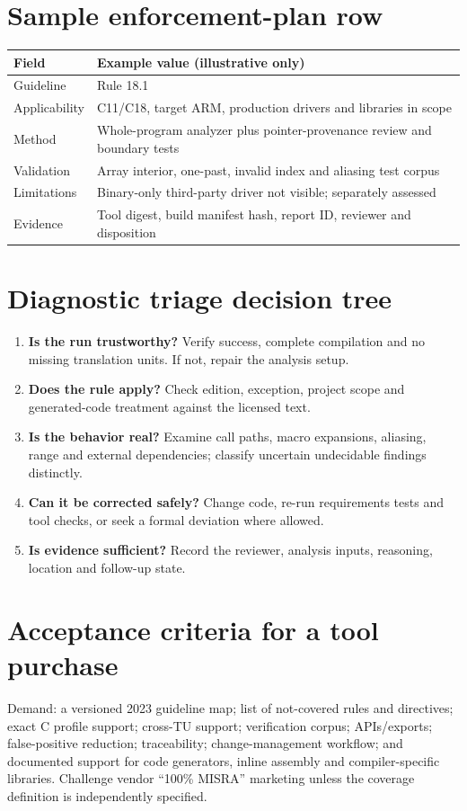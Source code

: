 \documentclass[10pt,letterpaper]{article}
\begin{document}
\section{Sample enforcement-plan row}
\begin{tabularx}{\linewidth}{@{}p{.17\linewidth}X@{}}\toprule
Field & Example value (illustrative only)\\\midrule
Guideline & Rule 18.1\\
Applicability & C11/C18, target ARM, production drivers and libraries in scope\\
Method & Whole-program analyzer plus pointer-provenance review and boundary tests\\
Validation & Array interior, one-past, invalid index and aliasing test corpus\\
Limitations & Binary-only third-party driver not visible; separately assessed\\
Evidence & Tool digest, build manifest hash, report ID, reviewer and disposition\\\bottomrule\end{tabularx}
\section{Diagnostic triage decision tree}
\begin{enumerate}
\item \textbf{Is the run trustworthy?} Verify success, complete compilation and no missing translation units. If not, repair the analysis setup.
\item \textbf{Does the rule apply?} Check edition, exception, project scope and generated-code treatment against the licensed text.
\item \textbf{Is the behavior real?} Examine call paths, macro expansions, aliasing, range and external dependencies; classify uncertain undecidable findings distinctly.
\item \textbf{Can it be corrected safely?} Change code, re-run requirements tests and tool checks, or seek a formal deviation where allowed.
\item \textbf{Is evidence sufficient?} Record the reviewer, analysis inputs, reasoning, location and follow-up state.
\end{enumerate}
\section{Acceptance criteria for a tool purchase}
Demand: a versioned 2023 guideline map; list of not-covered rules and directives; exact C profile support; cross-TU support; verification corpus; APIs/exports; false-positive reduction; traceability; change-management workflow; and documented support for code generators, inline assembly and compiler-specific libraries. Challenge vendor ``100\% MISRA'' marketing unless the coverage definition is independently specified.
\end{document}
